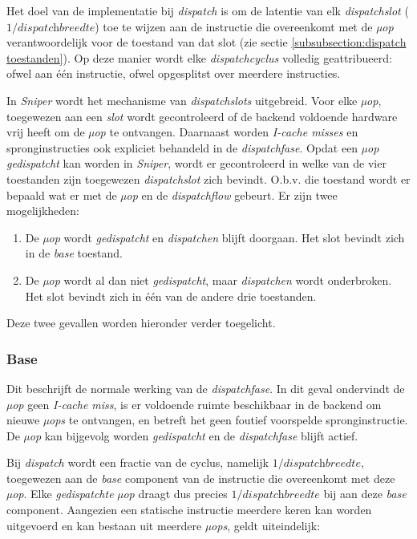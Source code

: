 \documentclass[12pt,a4paper,faculty=ea,language=nl]{ugent-doc}
\begin{document}
Het doel van de implementatie bij \textit{dispatch} is om de latentie van elk \textit{dispatchslot} (\(1 / \textit{dispatchbreedte}\)) toe te wijzen aan de instructie die overeenkomt met de \textit{µop} verantwoordelijk voor de toestand van dat slot (zie sectie \ref{subsubsection:dispatch toestanden}).
Op deze manier wordt elke \textit{dispatchcyclus} volledig geattribueerd: ofwel aan één instructie, ofwel opgesplitst over meerdere instructies.

In \textit{Sniper} wordt het mechanisme van \textit{dispatchslots} uitgebreid. Voor elke \textit{µop}, toegewezen aan een \textit{slot} wordt gecontroleerd of de backend voldoende hardware vrij heeft om de \textit{µop} te ontvangen.
Daarnaast worden \textit{I-cache misses} en spronginstructies ook expliciet behandeld in de \textit{dispatchfase}.
Opdat een \textit{µop} \textit{gedispatcht} kan worden in \textit{Sniper}, wordt er gecontroleerd in welke van de vier toestanden zijn toegewezen \textit{dispatchslot} zich bevindt.
O.b.v. die toestand wordt er bepaald wat er met de \textit{µop} en de \textit{dispatchflow} gebeurt. Er zijn twee mogelijkheden:
\begin{enumerate}
    \item De \textit{µop} wordt \textit{gedispatcht} en \textit{dispatchen} blijft doorgaan. Het slot bevindt zich in de \textit{base} toestand.
    \item De \textit{µop} wordt al dan niet \textit{gedispatcht}, maar \textit{dispatchen} wordt onderbroken. Het slot bevindt zich in één van de andere drie toestanden.
\end{enumerate}

Deze twee gevallen worden hieronder verder toegelicht.

\subsubsection{Base}


Dit beschrijft de normale werking van de \textit{dispatchfase}. In dit geval ondervindt de \textit{µop} geen \textit{I-cache miss}, is er voldoende ruimte beschikbaar in de backend om nieuwe \textit{µops} te ontvangen, en betreft het geen foutief voorspelde spronginstructie. De \textit{µop} kan bijgevolg worden \textit{gedispatcht} en de \textit{dispatchfase} blijft actief.

Bij \textit{dispatch} wordt een fractie van de cyclus, namelijk \(1 / \textit{dispatchbreedte}\), toegewezen aan de \textit{base} component van de instructie die overeenkomt met deze \textit{µop}. Elke \textit{gedispatchte} \textit{µop} draagt dus precies $1 / \textit{dispatchbreedte}$ bij aan deze \textit{base} component.
Aangezien een statische instructie meerdere keren kan worden uitgevoerd en kan bestaan uit meerdere \textit{µops}, geldt uiteindelijk:
\end{document}
